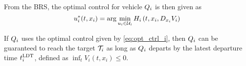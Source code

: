 From the BRS, the optimal control for vehicle $Q_i$ is then given as
\begin{equation}
\label{eq:opt_ctrl_i}
u_i^*(t, x_i) = \arg \min_{u_i \in \mathcal{U}_i} H_i\left(t, x_i, D_{x_i} V_i\right)
\end{equation}

If $Q_i$ uses the optimal control given by \eqref{eq:opt_ctrl_i}, then $Q_i$ can be guaranteed to reach the target $\mathcal{T}_i$ as long as $Q_i$ departs by the latest departure time $t^\text{LDT}_i$, defined as $\inf_t V_i(t, x_i) \le 0$.
